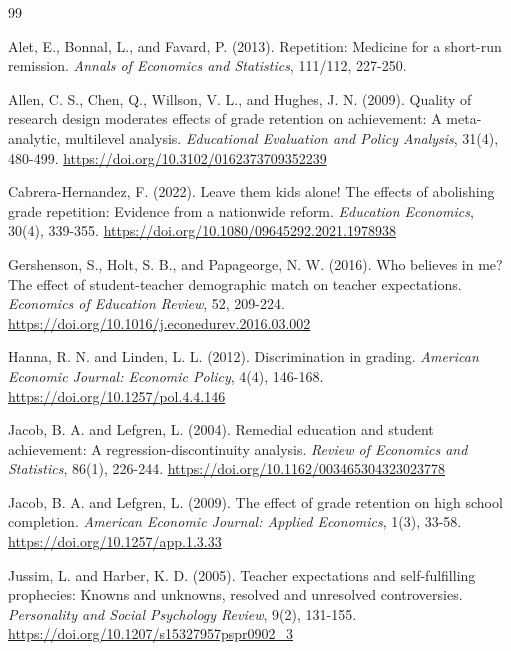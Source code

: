 \documentclass[12pt,a4paper]{article}
\begin{document}
\begin{thebibliography}{99}

Alet, E., Bonnal, L., and Favard, P. (2013).
Repetition: Medicine for a short-run remission.
\textit{Annals of Economics and Statistics}, 111/112, 227-250.

Allen, C. S., Chen, Q., Willson, V. L., and Hughes, J. N. (2009).
Quality of research design moderates effects of grade retention on achievement: A meta-analytic, multilevel analysis.
\textit{Educational Evaluation and Policy Analysis}, 31(4), 480-499.
\url{https://doi.org/10.3102/0162373709352239}

Cabrera-Hernandez, F. (2022).
Leave them kids alone! The effects of abolishing grade repetition: Evidence from a nationwide reform.
\textit{Education Economics}, 30(4), 339-355.
\url{https://doi.org/10.1080/09645292.2021.1978938}

Gershenson, S., Holt, S. B., and Papageorge, N. W. (2016).
Who believes in me? The effect of student-teacher demographic match on teacher expectations.
\textit{Economics of Education Review}, 52, 209-224.
\url{https://doi.org/10.1016/j.econedurev.2016.03.002}

Hanna, R. N. and Linden, L. L. (2012).
Discrimination in grading.
\textit{American Economic Journal: Economic Policy}, 4(4), 146-168.
\url{https://doi.org/10.1257/pol.4.4.146}

Jacob, B. A. and Lefgren, L. (2004).
Remedial education and student achievement: A regression-discontinuity analysis.
\textit{Review of Economics and Statistics}, 86(1), 226-244.
\url{https://doi.org/10.1162/003465304323023778}

Jacob, B. A. and Lefgren, L. (2009).
The effect of grade retention on high school completion.
\textit{American Economic Journal: Applied Economics}, 1(3), 33-58.
\url{https://doi.org/10.1257/app.1.3.33}

Jussim, L. and Harber, K. D. (2005).
Teacher expectations and self-fulfilling prophecies: Knowns and unknowns, resolved and unresolved controversies.
\textit{Personality and Social Psychology Review}, 9(2), 131-155.
\url{https://doi.org/10.1207/s15327957pspr0902_3}


\end{thebibliography}
\end{document}
